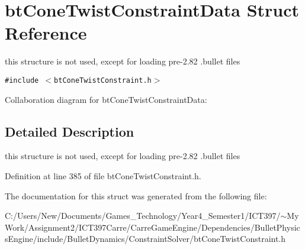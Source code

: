 \hypertarget{structbt_cone_twist_constraint_data}{
\section{btConeTwistConstraintData Struct Reference}
\label{structbt_cone_twist_constraint_data}
}
this structure is not used, except for loading pre-2.82 .bullet files  


{\tt \#include $<$btConeTwistConstraint.h$>$}

Collaboration diagram for btConeTwistConstraintData:

\subsection{Detailed Description}
this structure is not used, except for loading pre-2.82 .bullet files 

Definition at line 385 of file btConeTwistConstraint.h.

The documentation for this struct was generated from the following file:\begin{CompactItemize}
\item 
C:/Users/New/Documents/Games\_\-Technology/Year4\_\-Semester1/ICT397/$\sim$My Work/Assignment2/ICT397Carre/CarreGameEngine/Dependencies/BulletPhysicsEngine/include/BulletDynamics/ConstraintSolver/btConeTwistConstraint.h\end{CompactItemize}
